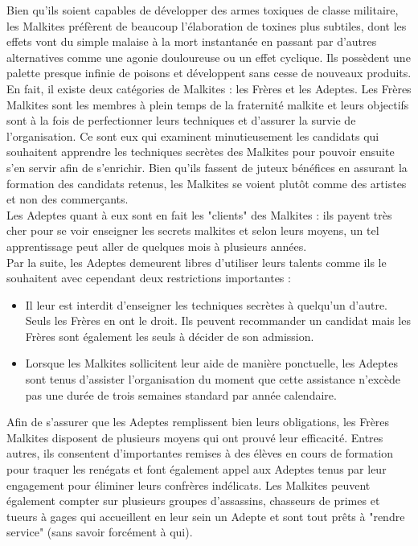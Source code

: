 \documentclass[twoside]{article}
\begin{document}
Bien qu'ils soient capables de développer des armes toxiques de classe militaire, les Malkites préfèrent de beaucoup l'élaboration de toxines plus subtiles, dont les effets vont du simple malaise à la mort instantanée en passant par d'autres alternatives comme une agonie douloureuse ou un effet cyclique. Ils possèdent une palette presque infinie de poisons et développent sans cesse de nouveaux produits.
En fait, il existe deux catégories de Malkites : les Frères et les Adeptes. Les Frères Malkites sont les membres à plein temps de la fraternité malkite et leurs objectifs sont à la fois de perfectionner leurs techniques et d'assurer la survie de l'organisation. Ce sont eux qui examinent minutieusement les candidats qui souhaitent apprendre les techniques secrètes des Malkites pour pouvoir ensuite s'en servir afin de s'enrichir. Bien qu'ils fassent de juteux bénéfices en assurant la formation des candidats retenus, les Malkites se voient plutôt comme des artistes et non des commerçants.\\

Les Adeptes quant à eux sont en fait les "clients" des Malkites : ils payent très cher pour se voir enseigner les secrets malkites et selon leurs moyens, un tel apprentissage peut aller de quelques mois à plusieurs années.\\

Par la suite, les Adeptes demeurent libres d'utiliser leurs talents comme ils le souhaitent avec cependant deux restrictions importantes :\\

\begin{itemize}
	\item Il leur est interdit d'enseigner les techniques secrètes à quelqu'un d'autre. Seuls les Frères en ont le droit. Ils peuvent recommander un candidat mais les Frères sont également les seuls à décider de son admission.
	\item Lorsque les Malkites sollicitent leur aide de manière ponctuelle, les Adeptes sont tenus d'assister l'organisation du moment que cette assistance n'excède pas une durée de trois semaines standard par année calendaire. 
\end{itemize}

Afin de s'assurer que les Adeptes remplissent bien leurs obligations, les Frères Malkites disposent de plusieurs moyens qui ont prouvé leur efficacité. Entres autres, ils consentent d'importantes remises à des élèves en cours de formation pour traquer les renégats et font également appel aux Adeptes tenus par leur engagement pour éliminer leurs confrères indélicats. Les Malkites peuvent également compter sur plusieurs groupes d'assassins, chasseurs de primes et tueurs à gages qui accueillent en leur sein un Adepte et sont tout prêts à "rendre service" (sans savoir forcément à qui).\\
\end{document}
